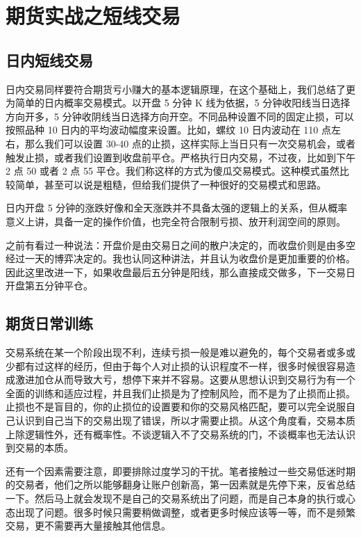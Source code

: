 \chapter{期货实战之短线交易}
\section{日内短线交易}
日内交易同样要符合期货亏小赚大的基本逻辑原理，在这个基础上，我们总结了更为简单的日内概率交易模式。以开盘 5 分钟 K 线为依据，5 分钟收阳线当日选择方向开多，5 分钟收阴线当日选择方向开空。不同品种设置不同的固定止损，可以按照品种 10 日内的平均波动幅度来设置。比如，螺纹 10 日内波动在 110 点左右，那么我们可以设置 30-40 点的止损，这样实际上当日只有一次交易机会，或者触发止损，或者我们设置到收盘前平仓。严格执行日内交易，不过夜，比如到下午 2 点 50 或者 2 点 55 平仓。我们称这样的方式为傻瓜交易模式。这种模式虽然比较简单，甚至可以说是粗糙，但给我们提供了一种很好的交易模式和思路。

日内开盘 5 分钟的涨跌好像和全天涨跌并不具备太强的逻辑上的关系，但从概率意义上讲，具备一定的操作价值，也完全符合限制亏损、放开利润空间的原则。
\begin{tcolorbox}
    之前有看过一种说法：开盘价是由交易日之间的散户决定的，而收盘价则是由多空经过一天的博弈决定的。我也认同这种讲法，并且认为收盘价是更加重要的价格。因此这里改进一下，如果收盘最后五分钟是阳线，那么直接成交做多，下一交易日开盘第五分钟平仓。
\end{tcolorbox}
\section{期货日常训练}
交易系统在某一个阶段出现不利，连续亏损一般是难以避免的，每个交易者或多或少都有过这样的经历，但由于每个人对止损的认识程度不一样，很多时候很容易造成激进加仓从而导致大亏，想停下来并不容易。这要从思想认识到交易行为有一个全面的训练和适应过程，并且我们止损是为了控制风险，而不是为了止损而止损。止损也不是盲目的，你的止损位的设置要和你的交易风格匹配，要可以完全说服自己认识到自己当下的交易出现了错误，所以才需要止损。从这个角度看，交易本质上除逻辑性外，还有概率性。不谈逻辑入不了交易系统的门，不谈概率也无法认识到交易的本质。

还有一个因素需要注意，即要排除过度学习的干扰。笔者接触过一些交易低迷时期的交易者，他们之所以能够翻身让账户创新高，第一因素就是先停下来，反省总结一下。然后马上就会发现不是自己的交易系统出了问题，而是自己本身的执行或心态出现了问题。很多时候只需要稍做调整，或者更多时候应该等一等，而不是频繁交易，更不需要再大量接触其他信息。